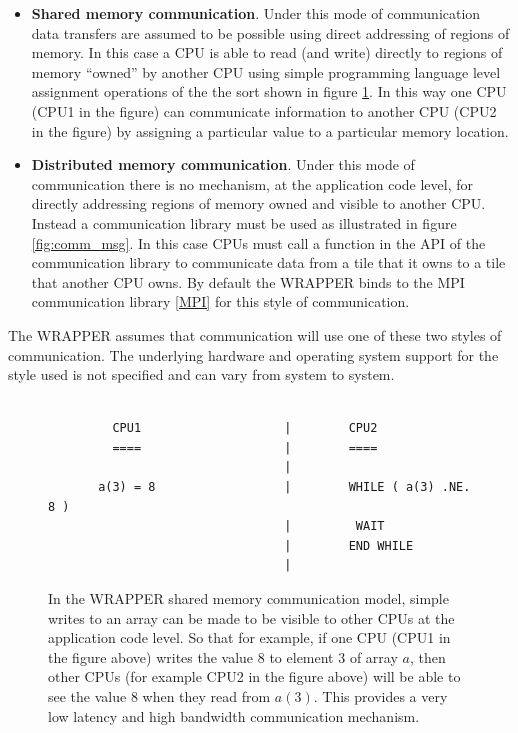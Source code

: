\begin{itemize}
\item {\bf Shared memory communication}.  Under this mode of
  communication data transfers are assumed to be possible using direct
  addressing of regions of memory.  In this case a CPU is able to read
  (and write) directly to regions of memory ``owned'' by another CPU
  using simple programming language level assignment operations of the
  the sort shown in figure \ref{fig:simple_assign}.  In this way one
  CPU (CPU1 in the figure) can communicate information to another CPU
  (CPU2 in the figure) by assigning a particular value to a particular
  memory location.

\item {\bf Distributed memory communication}.  Under this mode of
  communication there is no mechanism, at the application code level,
  for directly addressing regions of memory owned and visible to
  another CPU. Instead a communication library must be used as
  illustrated in figure \ref{fig:comm_msg}. In this case CPUs must
  call a function in the API of the communication library to
  communicate data from a tile that it owns to a tile that another CPU
  owns. By default the WRAPPER binds to the MPI communication library
  \ref{MPI} for this style of communication.
\end{itemize}

The WRAPPER assumes that communication will use one of these two styles
of communication.  The underlying hardware and operating system support
for the style used is not specified and can vary from system to system.

\begin{figure}
\begin{verbatim}

         CPU1                    |        CPU2
         ====                    |        ====
                                 |
       a(3) = 8                  |        WHILE ( a(3) .NE. 8 ) 
                                 |         WAIT
                                 |        END WHILE
                                 |
\end{verbatim}
\caption{In the WRAPPER shared memory communication model, simple writes to an
array can be made to be visible to other CPUs at the application code level.
So that for example, if one CPU (CPU1 in the figure above) writes the value $8$ to 
element $3$ of array $a$, then other CPUs (for example CPU2 in the figure above)
will be able to see the value $8$ when they read from $a(3)$.
This provides a very low latency and high bandwidth communication 
mechanism.
} \label{fig:simple_assign}
\end{figure}


